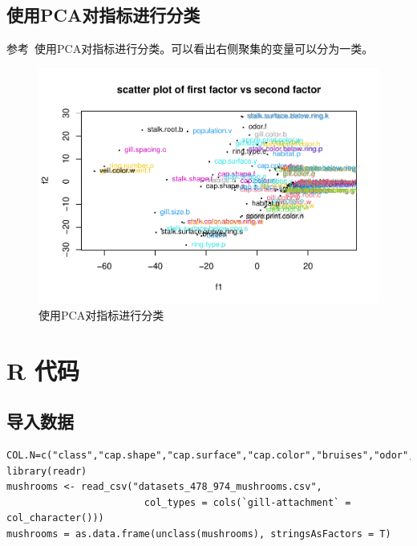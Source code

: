 \documentclass[lang=cn,11pt,a4paper,cite=super]{elegantpaper}
\begin{document}
\subsection{使用PCA对指标进行分类}
参考~\cite{ghx}使用PCA对指标进行分类。可以看出右侧聚集的变量可以分为一类。
\begin{figure}[htb]
   \centering
   \includegraphics[width=\linewidth]{img/pcaf-1.pdf}
   \caption{使用PCA对指标进行分类}
   \label{fig:pcaf}
 \end{figure}


\newpage
\section{R 代码}

\subsection{导入数据}\label{sec:importdata}
\begin{lstlisting}[style=R]
COL.N=c("class","cap.shape","cap.surface","cap.color","bruises","odor","gill.attachment","gill.spacing","gill.size","gill.color","stalk.shape","stalk.root","stalk.surface.above.ring","stalk.surface.below.ring","stalk.color.above.ring","stalk.color.below.ring","veil.type","veil.color","ring.number","ring.type","spore.print.color","population","habitat")
library(readr)
mushrooms <- read_csv("datasets_478_974_mushrooms.csv",
                        col_types = cols(`gill-attachment` = col_character()))
mushrooms = as.data.frame(unclass(mushrooms), stringsAsFactors = T)
\end{lstlisting}
\end{document}
